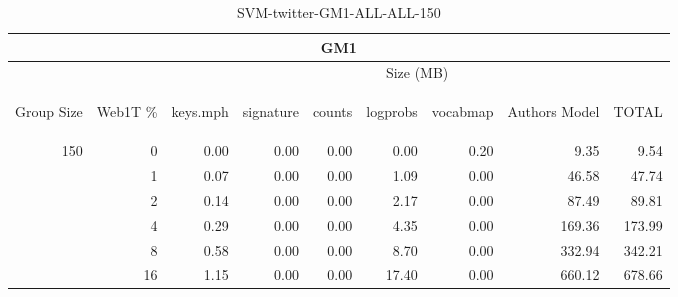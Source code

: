 \begin{center}
\begin{table}[htbp] 
 \begin{center}
\begin{tabular}{ | r | r | r | r | r | r | r | r | r |}
\hline
\multicolumn{9}{|c|}{GM1}\\
\hline
 & & \multicolumn{7}{|c|}{Size (MB)}\\ \cline{3-9}
\begin{sideways}Group Size\end{sideways} & \begin{sideways}Web1T \% \end{sideways} & \begin{sideways}keys.mph\end{sideways} & \begin{sideways}signature\end{sideways} & \begin{sideways}counts\end{sideways} & \begin{sideways}logprobs\end{sideways} & \begin{sideways}vocabmap\end{sideways} & \begin{sideways}Authors Model \end{sideways} & \begin{sideways}TOTAL\end{sideways}\\
\hline
\multirow{5}{*}{150}
 & 0 & 0.00 & 0.00 & 0.00 & 0.00 & 0.20 & 9.35 & 9.54\\ \cline{2-9}
 & 1 & 0.07 & 0.00 & 0.00 & 1.09 & 0.00 & 46.58 & 47.74\\ \cline{2-9}
 & 2 & 0.14 & 0.00 & 0.00 & 2.17 & 0.00 & 87.49 & 89.81\\ \cline{2-9}
 & 4 & 0.29 & 0.00 & 0.00 & 4.35 & 0.00 & 169.36 & 173.99\\ \cline{2-9}
 & 8 & 0.58 & 0.00 & 0.00 & 8.70 & 0.00 & 332.94 & 342.21\\ \cline{2-9}
 & 16 & 1.15 & 0.00 & 0.00 & 17.40 & 0.00 & 660.12 & 678.66\\ \cline{2-9}
\hline
\end{tabular}
\caption{SVM-twitter-GM1-ALL-ALL-150}
\label{table:SVM-twitter-GM1-ALL-ALL-150}
\end{center}
 \end{table}
\end{center}

